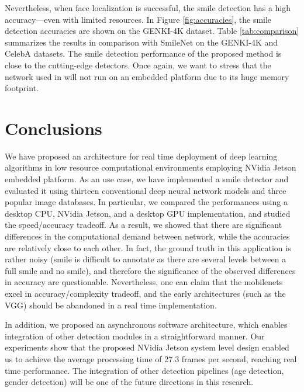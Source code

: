 \documentclass[conference]{IEEEtran}
\begin{document}
Nevertheless, when face localization is successful, the smile detection has a high accuracy---even with limited resources. In Figure \ref{fig:accuracies}, the smile detection accuracies are shown on the GENKI-4K dataset. Table \ref{tab:comparison} summarizes the results in comparison with SmileNet on the GENKI-4K and CelebA datasets. The smile detection performance of the proposed method is close to the cutting-edge detectors. Once again, we want to stress that the network used in  \cite{smilenet} will not run on an embedded platform due to its huge memory footprint.












\section{Conclusions}


We have proposed an architecture for real time deployment of deep learning algorithms in low resource computational environments employing NVidia Jetson embedded platform. As an use case, we have implemented a smile detector and evaluated it using thirteen conventional deep neural network models and three popular image databases.
In particular, we compared the performances using a desktop CPU, NVidia Jetson, and a desktop GPU implementation, and studied the speed/accuracy tradeoff. As a result, we showed that there are significant differences in the computational demand between network, while the accuracies are relatively close to each other. In fact, the ground truth in this application is rather noisy (smile is difficult to annotate as there are several levels between a full smile and no smile), and therefore the significance of the observed differences in accuracy are questionable. Nevertheless, one can claim that the mobilenets excel in accuracy/complexity tradeoff, and the early architectures (such as the VGG) should be abandoned in a real time implementation.

In addition, we proposed an asynchronous software architecture, which enables integration of other detection modules in a straightforward manner. Our experiments show that the proposed NVidia Jetson system level design enabled us to achieve the average processing time of 27.3 frames per second, reaching real time performance. The integration of other detection pipelines (age detection, gender detection) will be one of the future directions in this research.
\end{document}
